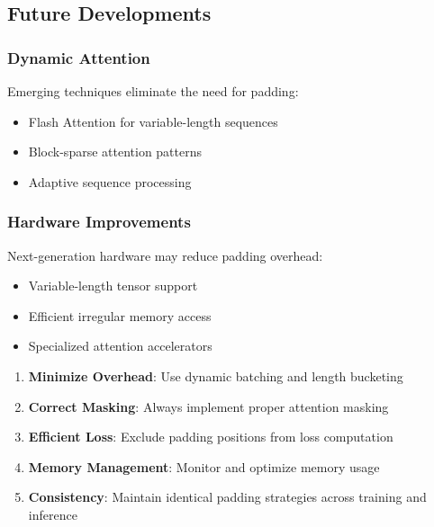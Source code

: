 \subsection{Future Developments}

\subsubsection{Dynamic Attention}
Emerging techniques eliminate the need for padding:
\begin{itemize}
\item Flash Attention for variable-length sequences
\item Block-sparse attention patterns
\item Adaptive sequence processing
\end{itemize}

\subsubsection{Hardware Improvements}
Next-generation hardware may reduce padding overhead:
\begin{itemize}
\item Variable-length tensor support
\item Efficient irregular memory access
\item Specialized attention accelerators
\end{itemize}

\begin{principle}
\begin{enumerate}
\item \textbf{Minimize Overhead}: Use dynamic batching and length bucketing
\item \textbf{Correct Masking}: Always implement proper attention masking
\item \textbf{Efficient Loss}: Exclude padding positions from loss computation
\item \textbf{Memory Management}: Monitor and optimize memory usage
\item \textbf{Consistency}: Maintain identical padding strategies across training and inference
\end{enumerate}
\end{principle}

